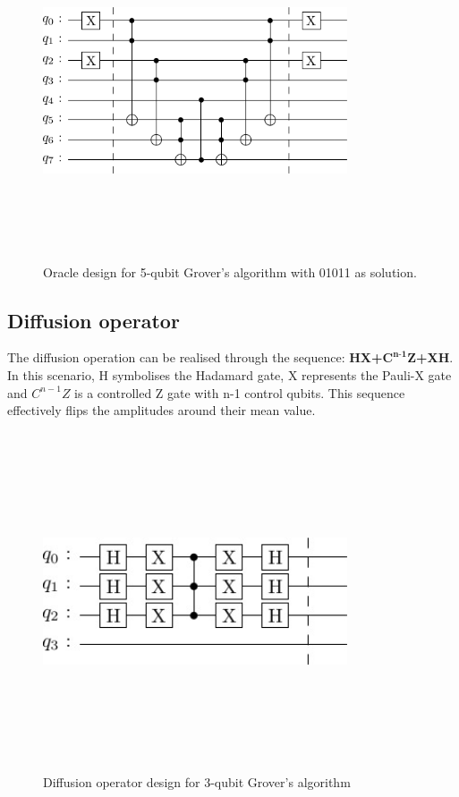 \documentclass[conference]{IEEEtran}
\begin{document}
\begin{figure}[htbp]
	\centerline{\includegraphics[width=9cm,height=10cm,keepaspectratio]{5-qubit-01011.png}}
	\caption{Oracle design for 5-qubit Grover's algorithm with 01011 as solution.}
	\label{fig:5-qubit}
\end{figure}

\subsection{Diffusion operator}
The diffusion operation can be realised through the sequence: \textbf{HX+$\textbf{C}^{\textbf{n-1}}\textbf{Z}$+XH}. In this scenario, H symbolises
the Hadamard gate, X represents the Pauli-X gate and $C^{n-1}Z$ is a controlled Z gate with n-1 control qubits. This sequence effectively flips the amplitudes around their
mean value.

\begin{figure}[htbp]
	\centerline{\includegraphics[width=9cm,height=10cm,keepaspectratio]{3-qubit-diff.png}}
	\caption{Diffusion operator design for 3-qubit Grover’s algorithm}
	\label{3diff}
\end{figure}
\end{document}
